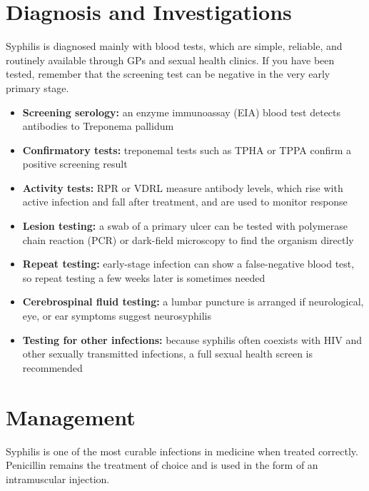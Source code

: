 \section*{Diagnosis and Investigations}
Syphilis is diagnosed mainly with blood tests, which are simple, reliable, and routinely available through GPs and sexual health clinics. If you have been tested, remember that the screening test can be negative in the very early primary stage.

\begin{itemize}
    \item \textbf{Screening serology:} an enzyme immunoassay (EIA) blood test detects antibodies to Treponema pallidum
    \item \textbf{Confirmatory tests:} treponemal tests such as TPHA or TPPA confirm a positive screening result
    \item \textbf{Activity tests:} RPR or VDRL measure antibody levels, which rise with active infection and fall after treatment, and are used to monitor response
    \item \textbf{Lesion testing:} a swab of a primary ulcer can be tested with polymerase chain reaction (PCR) or dark-field microscopy to find the organism directly
    \item \textbf{Repeat testing:} early-stage infection can show a false-negative blood test, so repeat testing a few weeks later is sometimes needed
    \item \textbf{Cerebrospinal fluid testing:} a lumbar puncture is arranged if neurological, eye, or ear symptoms suggest neurosyphilis
    \item \textbf{Testing for other infections:} because syphilis often coexists with HIV and other sexually transmitted infections, a full sexual health screen is recommended
\end{itemize}

\section*{Management}
Syphilis is one of the most curable infections in medicine when treated correctly. Penicillin remains the treatment of choice and is used in the form of an intramuscular injection.

